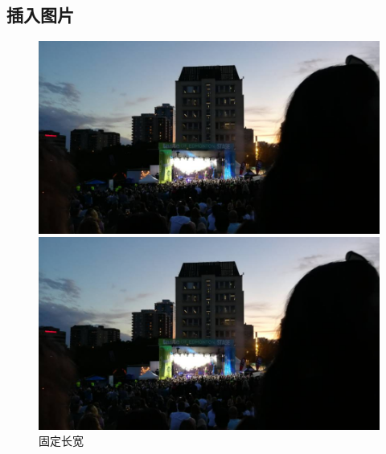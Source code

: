 \documentclass[UTF8,12pt,a4paper]{article}
\begin{document}
\subsection{插入图片}

\begin{figure}[!h]
	\centering
	\begin{minipage}[c]{0.45\textwidth}
		\centering
		\includegraphics[width=\linewidth, height=0.4\textheight]{city}
	\end{minipage}
	\quad
	\begin{minipage}[c]{0.45\textwidth}
		\centering
		\includegraphics[width=\linewidth, height=0.4\textheight]{city}
	\end{minipage}
	\caption{固定长宽}
\end{figure}
\end{document}
